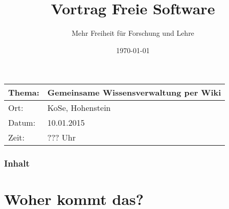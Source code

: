 \documentclass{beamer}              %
\title{Vortrag Freie Software}
\subtitle{Mehr Freiheit für Forschung und Lehre}
\date{\today}
\begin{document}

\begin{frame}
  \begin{center}
    \begin{longtable}{|l|l|}
      \hline
      
       \textbf{Thema:}        &  \textbf{Gemeinsame Wissensverwaltung per Wiki}                  \\ 
      \hline       
       Ort:                   &  KoSe, Hohenstein                                                \\ 
      \hline       
       Datum:                 &  10.01.2015                                                      \\
      \hline       
       Zeit:                  &  ??? Uhr                                               \\ 
      \hline       
    \end{longtable}
  \end{center}
\end{frame}




\begin{frame}
  \frametitle{Inhalt}
  \tableofcontents
\end{frame}

\AtBeginSection{%
  \tableofcontents[currentsection]
}

\section{Woher kommt das?}


\end{document}
